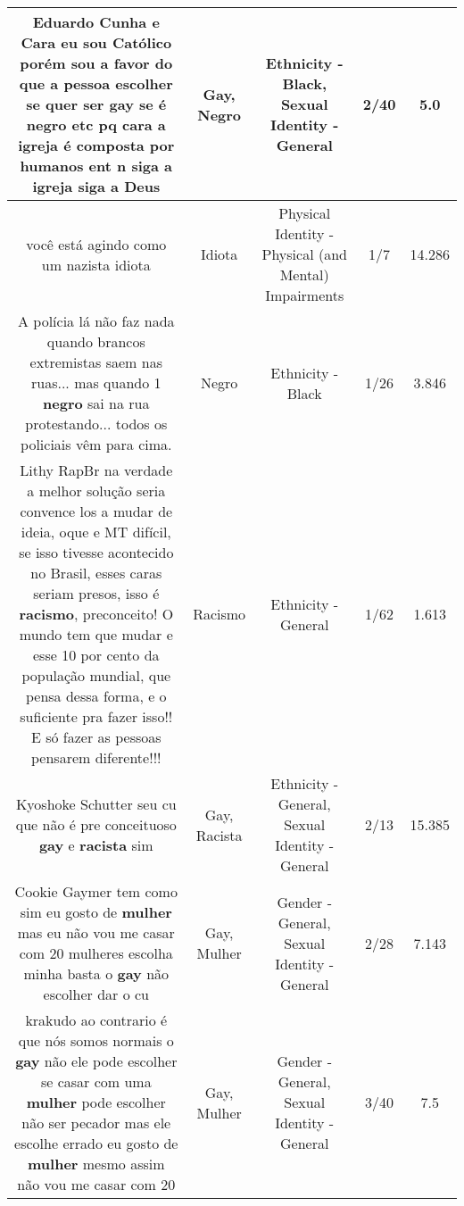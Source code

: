 \documentclass[11pt]{article}
\newlength\mylength
\begin{document}
\begin{center}
\begin{longtable}{|C{.65\mylength}|C{.30\mylength}|C{.12\mylength}|C{.12\mylength}|C{.12\mylength}|}
  \small Eduardo Cunha e Cara eu sou Católico porém sou a favor do que a pessoa escolher se quer ser \textbf{gay} se é \textbf{negro} etc pq cara a igreja é composta por humanos ent n siga a igreja siga a Deus\normalsize   & Gay, Negro & Ethnicity - Black, Sexual Identity - General & 2/40 & 5.0 \\  \hline
  \small você está agindo como um nazista idiota\normalsize   & Idiota & Physical Identity - Physical (and Mental) Impairments & 1/7 & 14.286 \\  \hline
  \small A polícia lá não faz nada quando brancos extremistas saem nas ruas... mas quando 1 \textbf{negro} sai na rua protestando... todos os policiais vêm para cima.\normalsize   & Negro & Ethnicity - Black & 1/26 & 3.846 \\  \hline
  \small Lithy RapBr na verdade a melhor solução seria convence los a mudar de ideia, oque e MT difícil, se isso tivesse acontecido no Brasil, esses caras seriam presos, isso é \textbf{racismo}, preconceito! O mundo tem que mudar e esse 10 por cento da população mundial, que pensa dessa forma, e o suficiente pra fazer isso!! E só fazer as pessoas pensarem diferente!!!\normalsize   & Racismo & Ethnicity - General & 1/62 & 1.613 \\  \hline
  \small Kyoshoke Schutter seu cu que não é pre conceituoso \textbf{gay} e \textbf{racista} sim\normalsize   & Gay, Racista & Ethnicity - General, Sexual Identity - General & 2/13 & 15.385 \\  \hline
  \small Cookie Gaymer tem como sim eu gosto de \textbf{mulher} mas eu não vou me casar com 20 mulheres escolha minha basta o \textbf{gay} não escolher dar o cu\normalsize   & Gay, Mulher & Gender - General, Sexual Identity - General & 2/28 & 7.143 \\  \hline
  \small krakudo ao contrario é que nós somos normais o \textbf{gay} não ele pode escolher se casar com uma \textbf{mulher} pode escolher não ser pecador mas ele escolhe errado eu gosto de \textbf{mulher} mesmo assim não vou me casar com 20\normalsize   & Gay, Mulher & Gender - General, Sexual Identity - General & 3/40 & 7.5 \\  \hline

\end{longtable}
\end{center}
\end{document}
